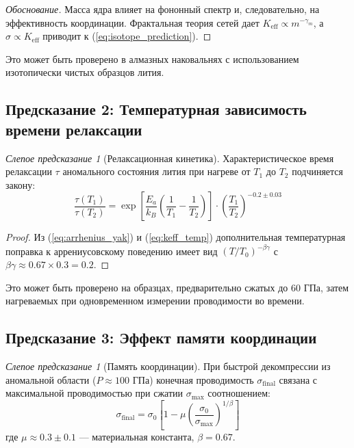 \documentclass[12pt,a4paper]{article}
\theoremstyle{remark}
\newtheorem{prediction}[theorem]{Слепое предсказание}
\newcommand{\Ke}{K_{\mathrm{eff}}}
\begin{document}
	\begin{proof}[Обоснование]
		Масса ядра влияет на фононный спектр и, следовательно, на эффективность координации. Фрактальная теория сетей дает \(\Ke \propto m^{-\gamma_m}\), а \(\sigma \propto \Ke\) приводит к (\ref{eq:isotope_prediction}).
	\end{proof}
	
	Это может быть проверено в алмазных наковальнях с использованием изотопически чистых образцов лития.
	
	\subsection{Предсказание 2: Температурная зависимость времени релаксации}
	
	\begin{prediction}[Релаксационная кинетика]
		Характеристическое время релаксации \(\tau\) аномального состояния лития при нагреве от \(T_1\) до \(T_2\) подчиняется закону:
		\begin{equation}
			\frac{\tau(T_1)}{\tau(T_2)} = \exp\left[ \frac{E_a}{k_B} \left( \frac{1}{T_1} - \frac{1}{T_2} \right) \right] \cdot \left( \frac{T_1}{T_2} \right)^{-0.2 \pm 0.03}
			\label{eq:relaxation_prediction}
		\end{equation}
		\label{pred:relaxation}
	\end{prediction}
	
	\begin{proof}
		Из (\ref{eq:arrhenius_yak}) и (\ref{eq:keff_temp}) дополнительная температурная поправка к аррениусовскому поведению имеет вид \((T/T_0)^{-\beta\gamma}\) с \(\beta\gamma \approx 0.67 \times 0.3 = 0.2\).
	\end{proof}
	
	Это может быть проверено на образцах, предварительно сжатых до 60 ГПа, затем нагреваемых при одновременном измерении проводимости во времени.
	
	\subsection{Предсказание 3: Эффект памяти координации}
	
	\begin{prediction}[Память координации]
		При быстрой декомпрессии из аномальной области (\(P \approx 100\) ГПа) конечная проводимость \(\sigma_{\text{final}}\) связана с максимальной проводимостью при сжатии \(\sigma_{\text{max}}\) соотношением:
		\begin{equation}
			\sigma_{\text{final}} = \sigma_0 \left[1 - \mu \left( \frac{\sigma_0}{\sigma_{\text{max}}} \right)^{1/\beta} \right]
			\label{eq:memory_prediction}
		\end{equation}
		где \(\mu \approx 0.3 \pm 0.1\) — материальная константа, \(\beta = 0.67\).
		\label{pred:memory}
	\end{prediction}
	
\end{document}
